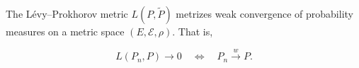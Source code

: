 The Lévy–Prokhorov metric $L(P, \tilde{P})$ metrizes weak convergence of probability measures on a metric space $(E, \mathcal{E}, \rho)$. That is,

$$L(P_n, P) \to 0 \quad\Longleftrightarrow\quad P_n \xrightarrow{w} P.$$
